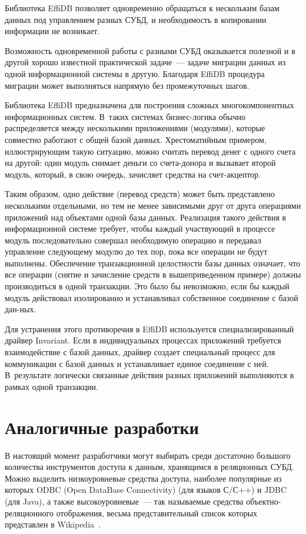 \begin{multicols}{2}
Библиотека EffiDB позволяет одновременно обращаться к нескольким базам данных под управ\-ле\-ни\-ем 
разных СУБД, и необходимость в копировании информации не возникает. 

Возможность одновременной работы с разными СУБД оказывается полезной и в другой 
хорошо известной практической задаче~--- задаче миграции данных из одной 
информационной системы в другую. Благодаря EffiDB процедура миграции может 
выполняться напрямую без промежуточных шагов.

Библиотека EffiDB предназначена для по\-стро\-ения сложных многокомпонентных информа\-ци\-онных 
сис\-тем. В~таких сис\-те\-мах биз\-нес-ло\-ги\-ка \mbox{обычно} распределяется между несколькими 
приложениями (модулями), которые совместно работают с общей базой данных. 
Хрестоматийным примером, иллюстрирующим такую ситуацию, можно считать перевод 
денег с одного счета на другой: один модуль снимает деньги со сче\-та-до\-но\-ра и 
вызывает второй модуль, который, в свою очередь, зачисляет средства на счет-ак\-цеп\-тор.

Таким образом, одно действие (перевод средств) может быть представлено несколькими 
отдельными, но тем не менее зависимыми друг от друга операциями приложений над 
объектами одной базы данных. Реализация такого действия в информационной системе 
требует, чтобы каждый участвующий в процессе модуль последовательно совершал 
необходимую операцию и передавал управление следующему модулю до тех пор, пока 
все операции не будут выполнены. Обеспечение транзакционной целостности базы 
данных означает, что все операции (снятие и зачисление средств в вышеприведенном 
примере) должны производиться в одной транзакции. Это было бы невозможно, если бы
каждый модуль действовал изолированно и уста\-нав\-ли\-вал собственное соединение с базой 
дан-\linebreak ных.

Для устранения этого противоречия в EffiDB используется специализированный драйвер 
Invariant. Если в индивидуальных процессах приложений требуется взаимодействие с 
базой данных, драйвер создает специальный процесс для коммуникации с базой данных и 
устанавливает единое соединение с ней. В~результате логически связанные действия 
разных приложений выполняются в рамках одной транзакции.

\section{Аналогичные разработки}

В настоящий момент разработчики могут выбирать среди достаточно большого 
количества инструментов доступа к данным, хранящимся в реляционных СУБД. Можно 
выделить низкоуровневые средства доступа, наиболее популярные из которых ODBC (Open
DataBase Connectivity) (для 
языков С/С++) и JDBC (для Java), а также высокоуровневые~--- так называемые средства 
объект\-но-ре\-ля\-ци\-он\-но\-го отображения, весьма представительный список которых 
представлен в Wikipedia~\cite{6-y}.


\end{multicols}
